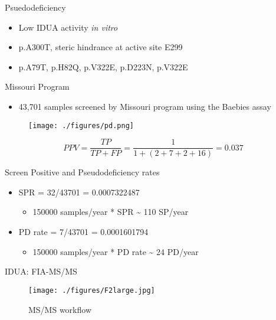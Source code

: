 \documentclass[presentation, smaller]{beamer}
\begin{document}
\begin{frame}[label={sec:orgheadline13}]{Psuedodeficiency}
\begin{itemize}
\item Low IDUA activity \emph{in vitro}
\item p.A300T, steric hindrance at active site E299
\item p.A79T, p.H82Q, p.V322E, p.D223N, p.V322E
\end{itemize}
\end{frame}


\begin{frame}[label={sec:orgheadline14}]{Missouri Program}
\begin{itemize}
\item 43,701 samples screened by Missouri program using the Baebies assay
\end{itemize}

\begin{figure}[htb]
\centering
\texttt{[image: ./figures/pd.png]}
\label{fig:pd}
\end{figure}


\[
 PPV = \frac{TP}{TP + FP}  = \frac{1}{1 + (2 + 7 + 2 + 16)} = 0.037
\]

\begin{block}{Screen Positive and Pseudodeficiency rates}
\begin{itemize}
\item SPR = 32/43701 =  0.0007322487
\begin{itemize}
\item 150000 samples/year * SPR \textasciitilde{}  110 SP/year
\end{itemize}
\item PD rate = 7/43701 = 0.0001601794
\begin{itemize}
\item 150000 samples/year * PD rate \textasciitilde{} 24 PD/year
\end{itemize}
\end{itemize}
\end{block}
\end{frame}

\begin{frame}[label={sec:orgheadline15}]{IDUA: FIA-MS/MS}
\begin{figure}[htb]
\centering
\texttt{[image: ./figures/F2large.jpg]}
\caption{\label{fig:msmswf}
MS/MS workflow}
\end{figure}
\end{frame}
\end{document}
